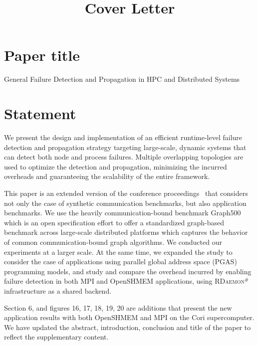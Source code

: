 \documentclass[1p,times]{elsarticle}
\newcommand{\ourwork}[0]{\textsc{RDaemon}\ensuremath{^\#}\xspace}
\begin{document}
\title{Cover Letter}

\section*{Paper title}
General Failure Detection and Propagation in HPC and Distributed Systems

\section*{Statement}
We present the design and implementation of an efficient runtime-level failure detection and propagation strategy targeting large-scale, dynamic systems that can detect both node and process failures. Multiple overlapping topologies are used to optimize the detection and propagation, minimizing the incurred overheads and guaranteeing the scalability of the entire framework.


This paper is an extended version of the conference proceedings~\cite{Zhong:2019:RLF:3343211.3343225} that considers not only the case of synthetic communication benchmarks, but also application benchmarks.
We use the heavily communication-bound benchmark Graph500 which is an open specification effort to offer a standardized graph-based benchmark across large-scale distributed
platforms which captures the behavior of common communication-bound graph algorithms.
We conducted our experiments at a larger scale. At the same time, we expanded the study to consider the case of applications using parallel global address space (PGAS) programming models, and study and compare the overhead incurred by enabling failure detection in both MPI and OpenSHMEM applications, using \ourwork infrastructure as a shared backend.

Section 6, and figures 16, 17, 18, 19, 20 are additions that present the new application results with both OpenSHMEM and MPI on the Cori supercomputer. We have updated the abstract, introduction, conclusion and title of the paper to reflect the supplementary content.



\end{document}
